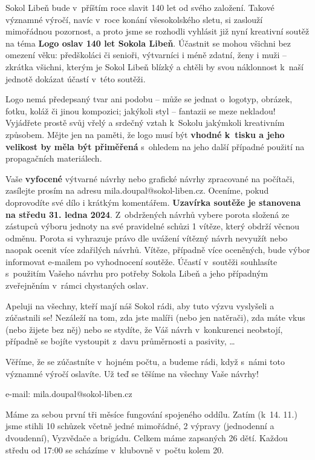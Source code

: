 \documentclass[11pt]{article}
\begin{document}
\vspace*{12pt}

\noindent
Sokol Libeň bude v~příštím roce slavit 140 let od svého založení. Takové významné výročí, navíc v~roce konání všesokolského sletu, si zaslouží mimořádnou pozornost, a proto jsme se rozhodli vyhlásit již nyní kreativní soutěž na téma \luv{}\textbf{Logo oslav 140 let Sokola Libeň}\ruv{}.
Účastnit se mohou všichni bez omezení věku: předškoláci či senioři, výtvarníci i méně zdatní, ženy i muži – zkrátka všichni, kterým je Sokol Libeň blízký a chtěli by svou náklonnost k~naší jednotě dokázat účastí v~této soutěži.

Logo nemá předepsaný tvar ani podobu – může se jednat o~logotyp, obrázek, fotku, koláž či jinou kompozici; jakýkoli styl – fantazii se meze nekladou! Vyjádřete prostě svůj vřelý a srdečný vztah k~Sokolu jakýmkoli kreativním způsobem. Mějte jen na paměti, že logo musí být \textbf{vhodné k~tisku a jeho velikost by měla být přiměřená} s~ohledem na jeho další případné použití na propagačních materiálech. 

Vaše \textbf{vyfocené} výtvarné návrhy nebo grafické návrhy zpracované na počítači, zasílejte prosím na adresu mila.doupal@sokol-liben.cz. Oceníme, pokud doprovodíte své dílo i krátkým komentářem. \textbf{Uzavírka soutěže je stanovena na středu 31. ledna 2024}. Z~obdržených návrhů vybere porota složená ze zástupců výboru jednoty na své pravidelné schůzi 1 vítěze, který obdrží věcnou odměnu.
Porota si vyhrazuje právo dle uvážení vítězný návrh nevyužít nebo naopak ocenit více zdařilých návrhů. Vítěze, případně více oceněných, bude výbor informovat e-mailem po vyhodnocení soutěže.
Účastí v~soutěži souhlasíte s~použitím Vašeho návrhu pro potřeby Sokola Libeň a jeho případným zveřejněním v~rámci chystaných oslav.

Apeluji na všechny, kteří mají náš Sokol rádi, aby tuto výzvu vyslyšeli a zúčastnili se! Nezáleží na tom, zda jste malíři (nebo jen natěrači), zda máte vkus (nebo žijete bez něj) nebo se stydíte, že Váš návrh v~konkurenci neobstojí, případně se bojíte vystoupit z~davu průměrnosti a pasivity, \ldots{}

Věříme, že se zúčastníte v~hojném počtu, a budeme rádi, když s~námi toto významné výročí oslavíte. Už teď se těšíme na všechny Vaše návrhy!

\signature{Miloslav Doupal}{e-mail: mila.doupal@sokol-liben.cz}

\vspace*{24pt}

Máme za sebou první tři měsíce fungování spojeného oddílu. Zatím (k~14. 11.) jsme stihli 10 schůzek včetně jedné mimořádné, 2 výpravy (jednodenní a dvoudenní), Vyzvědače a brigádu. Celkem máme zapsaných 26 dětí. Každou středu od 17:00 se scházíme v~klubovně v~počtu kolem 20.
\end{document}
